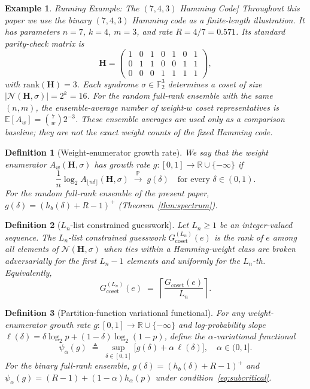 \documentclass[journal,10pt,onecolumn]{IEEEtran}
\newtheorem{definition}{Definition}
\newtheorem{example}{Example}
\newcommand{\Fb}{\mathbb{F}}
\newcommand{\Eb}{\mathbb{E}}
\newcommand{\Pb}{\mathbb{P}}
\newcommand{\Nb}{\mathcal{N}}
\newcommand{\Hb}{h_b}
\newcommand{\Hm}{\mathbf{H}}
\begin{document}
\begin{example}
Running Example: The $(7,4,3)$ Hamming Code]
\label{ex:hamming_intro}
Throughout this paper we use the binary $(7,4,3)$ Hamming code as a
finite-length illustration. It has parameters $n=7$, $k=4$, $m=3$,
and rate $R=4/7 = 0.571$.
Its standard parity-check matrix is
\[
\Hm=\begin{pmatrix}
1&0&1&0&1&0&1\\
0&1&1&0&0&1&1\\
0&0&0&1&1&1&1
\end{pmatrix},
\]
with $\mathrm{rank}(\Hm)=3$.
Each syndrome $\sigma\in\Fb_2^3$ determines a coset of size
$|\Nb(\Hm,\sigma)|=2^k=16$.
For the \emph{random full-rank ensemble} with the same $(n,m)$,
the ensemble-average number of weight-$w$ coset representatives is
$\Eb[A_w]=\binom{7}{w}2^{-3}$.
These ensemble averages are used only as a comparison baseline;
they are not the exact weight counts of the fixed Hamming code.
\end{example}




\begin{definition}[Weight-enumerator growth rate]
\label{def:g_delta}
We say that the weight enumerator $A_w(\Hm,\sigma)$ has
\emph{growth rate} $g:[0,1]\to\mathbb{R}\cup\{-\infty\}$ if
\[
    \frac{1}{n}\log_2 A_{\lfloor n\delta\rfloor}(\Hm,\sigma)
    \;\xrightarrow{\;\Pb\;}\;
    g(\delta)
    \quad
    \text{for every } \delta\in(0,1).
\]
For the random full-rank ensemble of the present paper,
$g(\delta)=(\Hb(\delta)+R-1)^+$ (Theorem~\ref{thm:spectrum}).
\end{definition}

\begin{definition}[$L_n$-list constrained guesswork]
\label{def:list_guesswork}
Let $L_n\ge 1$ be an integer-valued sequence.
The \emph{$L_n$-list constrained guesswork} $G_{\mathrm{coset}}^{(L_n)}(e)$
is the rank of $e$ among all elements of $\Nb(\Hm,\sigma)$ when
ties within a Hamming-weight class are broken adversarially for
the first $L_n-1$ elements and uniformly for the $L_n$-th.
Equivalently,
\[
    G_{\mathrm{coset}}^{(L_n)}(e)
    \;=\;
    \left\lceil \frac{G_{\mathrm{coset}}(e)}{L_n} \right\rceil.
\]
\end{definition}



\begin{definition}[Partition-function variational functional]
\label{def:psi}
For any weight-enumerator growth rate $g:[0,1]\to\mathbb{R}\cup\{-\infty\}$
and log-probability slope
$\ell(\delta)=\delta\log_2 p+(1-\delta)\log_2(1-p)$,
define the \emph{$\alpha$-variational functional}
\begin{equation}
    \psi_\alpha(g)
    \;\triangleq\;
    \sup_{\delta\in[0,1]}
    \bigl[g(\delta)+\alpha\,\ell(\delta)\bigr],
    \quad \alpha\in(0,1].
    \label{eq:psi_def}
\end{equation}
For the binary full-rank ensemble, $g(\delta)=(\Hb(\delta)+R-1)^+$
and $\psi_\alpha(g)=(R-1)+(1-\alpha)h_\alpha(p)$ under
condition~\eqref{eq:subcritical}.
\end{definition}
\end{document}

